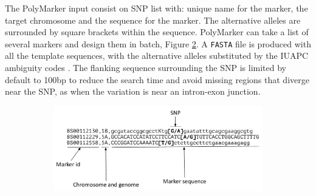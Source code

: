 The PolyMarker input consist on SNP list with: unique name for the marker, the target chromosome and the sequence for the marker. 
The alternative alleles are surrounded by square brackets within the sequence. PolyMarker can take a list of several markers and design them in batch, Figure \ref{fig:poly:input}. 
A \texttt{FASTA} file is produced with all the template sequences, with the alternative alleles substituted by the IUAPC ambiguity codes \citep{Cornish-Bowden1985}. 
The flanking sequence surrounding the SNP is limited by default to 100bp to reduce the search time and avoid missing regions that diverge near the SNP, as when the variation is near an intron-exon junction. 

\begin{figure}
    \centering
    \begin{subfigure}[b]{0.8\textwidth}
        \includegraphics[width=1\textwidth]{PolyMarker/Figures/aln/input.pdf} 
        \caption{}
        \label{fig:poly:input}
    \end{subfigure}


\end{figure}
